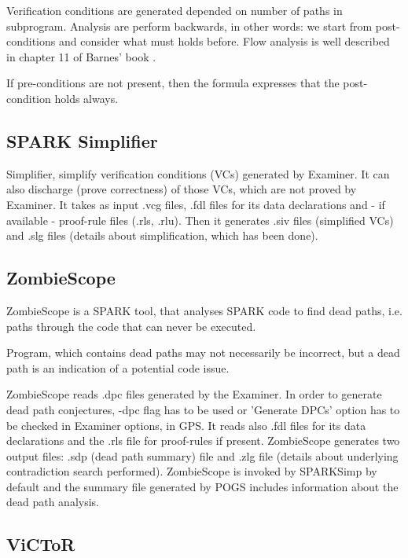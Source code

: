 Verification conditions are generated depended on number of paths in subprogram. Analysis are perform backwards, in other words: we start from post-conditions and consider what must holds before. Flow analysis is well described in chapter 11 of Barnes' book \cite{Barnes:Book}.

If pre-conditions are not present, then the formula expresses that the post-condition holds always.



\subsection{SPARK Simplifier}
\label{verification:simplifier}

Simplifier, simplify verification conditions (VCs) generated by Examiner. It can also discharge (prove correctness) of those VCs, which are not proved by Examiner. \cite{Simplifier:Online} It takes as input .vcg files, .fdl files for its data declarations and - if available - proof-rule files (.rls, .rlu). Then it generates .siv files (simplified VCs) and .slg files (details about simplification, which has been done).



\subsection{ZombieScope}
\label{verification:zombiescope}

ZombieScope is a SPARK tool, that analyses SPARK code to find dead paths, i.e. paths through the code that can never be executed.

Program, which contains dead paths may not necessarily be incorrect, but a dead path is an indication of a potential code issue.

ZombieScope reads .dpc files generated by the Examiner. In order to generate dead path conjectures, -dpc flag has to be used or 'Generate DPCs' option has to be checked in Examiner options, in GPS. It reads also .fdl files for its data declarations and the .rls file for proof-rules if present. ZombieScope generates two output files: .sdp (dead path summary) file and .zlg file (details about underlying contradiction search performed). ZombieScope is invoked by SPARKSimp by default and the summary file generated by POGS includes information about the dead path analysis.


\subsection{ViCToR}
\label{verification:victor}

